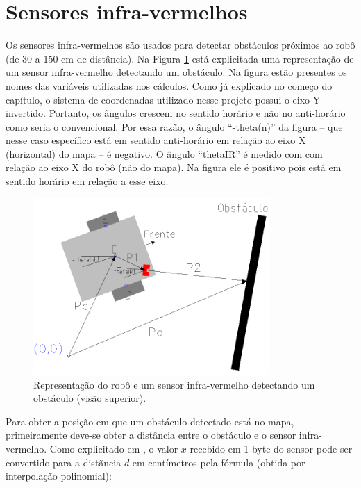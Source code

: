 

\section{Sensores infra-vermelhos}

Os sensores infra-vermelhos são usados para detectar obstáculos próximos ao robô (de 30 a 150 cm de distância). Na Figura \ref{fig:robo_ir} está explicitada uma representação de um sensor infra-vermelho detectando um obstáculo. Na figura estão presentes os nomes das variáveis utilizadas nos cálculos. Como já explicado no começo do capítulo, o sistema de coordenadas utilizado nesse projeto possui o eixo Y invertido. Portanto, os ângulos crescem no sentido horário e não no anti-horário como seria o convencional. Por essa razão, o ângulo ``-theta(n)'' da figura -- que nesse caso específico está em sentido anti-horário em relação ao eixo X (horizontal) do mapa -- é negativo. O ângulo ``thetaIR'' é medido com com relação ao eixo X do robô (não do mapa). Na figura ele é positivo pois está em sentido horário em relação a esse eixo.

\begin{figure}[H]
  \centering
  \includegraphics[width=0.8\textwidth, keepaspectratio]{./figuras/robo/robo_ir.png}
  \caption{Representação do robô e um sensor infra-vermelho detectando um obstáculo (visão superior).}
  \label{fig:robo_ir}
\end{figure}

Para obter a posição em que um obstáculo detectado está no mapa, primeiramente deve-se obter a distância entre o obstáculo e o sensor infra-vermelho. Como explicitado em \cite{bellator_2012}, o valor $x$ recebido em 1 byte do sensor pode ser convertido para a distãncia $d$ em centímetros pela fórmula (obtida por interpolação polinomial):

